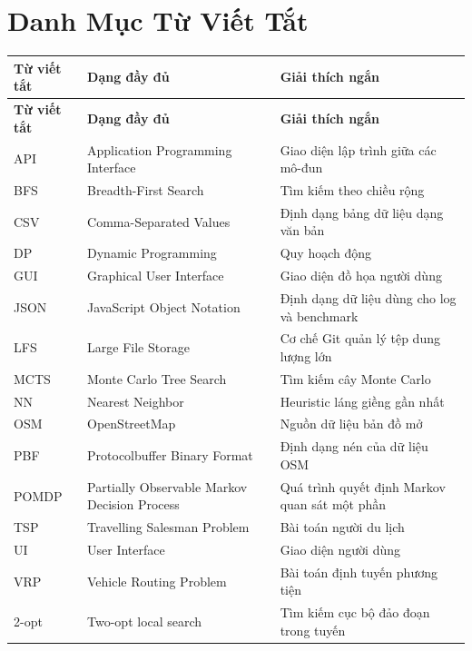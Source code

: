 \chapter*{Danh Mục Từ Viết Tắt}

\begin{longtable}{p{2.6cm}p{4.4cm}p{6.9cm}}
\toprule
\textbf{Từ viết tắt} & \textbf{Dạng đầy đủ} & \textbf{Giải thích ngắn} \\
\midrule
\endfirsthead
\toprule
\textbf{Từ viết tắt} & \textbf{Dạng đầy đủ} & \textbf{Giải thích ngắn} \\
\midrule
\endhead
API & Application Programming Interface & Giao diện lập trình giữa các mô-đun \\
BFS & Breadth-First Search & Tìm kiếm theo chiều rộng \\
CSV & Comma-Separated Values & Định dạng bảng dữ liệu dạng văn bản \\
DP & Dynamic Programming & Quy hoạch động \\
GUI & Graphical User Interface & Giao diện đồ họa người dùng \\
JSON & JavaScript Object Notation & Định dạng dữ liệu dùng cho log và benchmark \\
LFS & Large File Storage & Cơ chế Git quản lý tệp dung lượng lớn \\
MCTS & Monte Carlo Tree Search & Tìm kiếm cây Monte Carlo \\
NN & Nearest Neighbor & Heuristic láng giềng gần nhất \\
OSM & OpenStreetMap & Nguồn dữ liệu bản đồ mở \\
PBF & Protocolbuffer Binary Format & Định dạng nén của dữ liệu OSM \\
POMDP & Partially Observable Markov Decision Process & Quá trình quyết định Markov quan sát một phần \\
TSP & Travelling Salesman Problem & Bài toán người du lịch \\
UI & User Interface & Giao diện người dùng \\
VRP & Vehicle Routing Problem & Bài toán định tuyến phương tiện \\
2-opt & Two-opt local search & Tìm kiếm cục bộ đảo đoạn trong tuyến \\
\bottomrule
\end{longtable}
\clearpage
